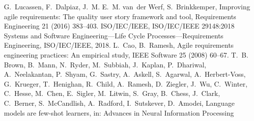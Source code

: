 \documentclass[10pt,a4paper]{article}
\providecommand{\bibinfo}[2]{#2}
\begin{document}
\clearpage
{}
{}
\begin{thebibliography}{25}

\bibinfo{author}{G.~Lucassen}, \bibinfo{author}{F.~Dalpiaz},
  \bibinfo{author}{J.~M. E.~M. van~der Werf}, \bibinfo{author}{S.~Brinkkemper},
\newblock \bibinfo{title}{Improving agile requirements: The quality user story
  framework and tool},
\newblock \bibinfo{journal}{Requirements Engineering} \bibinfo{volume}{21}
  (\bibinfo{year}{2016}) \bibinfo{pages}{383--403}.
\bibinfo{author}{{ISO/IEC/IEEE}}, \bibinfo{title}{ISO/IEC/IEEE 29148:2018
  Systems and Software Engineering---Life Cycle Processes---Requirements
  Engineering}, \bibinfo{organization}{ISO/IEC/IEEE}, \bibinfo{year}{2018}.
\bibinfo{author}{L.~Cao}, \bibinfo{author}{B.~Ramesh},
\newblock \bibinfo{title}{Agile requirements engineering practices: An
  empirical study},
\newblock \bibinfo{journal}{IEEE Software} \bibinfo{volume}{25}
  (\bibinfo{year}{2008}) \bibinfo{pages}{60--67}.
\bibinfo{author}{T.~B. Brown}, \bibinfo{author}{B.~Mann},
  \bibinfo{author}{N.~Ryder}, \bibinfo{author}{M.~Subbiah},
  \bibinfo{author}{J.~Kaplan}, \bibinfo{author}{P.~Dhariwal},
  \bibinfo{author}{A.~Neelakantan}, \bibinfo{author}{P.~Shyam},
  \bibinfo{author}{G.~Sastry}, \bibinfo{author}{A.~Askell},
  \bibinfo{author}{S.~Agarwal}, \bibinfo{author}{A.~Herbert-Voss},
  \bibinfo{author}{G.~Krueger}, \bibinfo{author}{T.~Henighan},
  \bibinfo{author}{R.~Child}, \bibinfo{author}{A.~Ramesh},
  \bibinfo{author}{D.~Ziegler}, \bibinfo{author}{J.~Wu},
  \bibinfo{author}{C.~Winter}, \bibinfo{author}{C.~Hesse},
  \bibinfo{author}{M.~Chen}, \bibinfo{author}{E.~Sigler},
  \bibinfo{author}{M.~Litwin}, \bibinfo{author}{S.~Gray},
  \bibinfo{author}{B.~Chess}, \bibinfo{author}{J.~Clark},
  \bibinfo{author}{C.~Berner}, \bibinfo{author}{S.~McCandlish},
  \bibinfo{author}{A.~Radford}, \bibinfo{author}{I.~Sutskever},
  \bibinfo{author}{D.~Amodei},
\newblock \bibinfo{title}{Language models are few-shot learners},
\newblock in: \bibinfo{booktitle}{Advances in Neural Information Processing
}
\end{thebibliography}
\end{document}
